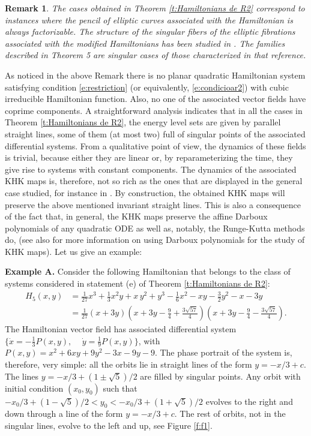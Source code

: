 \documentclass[11pt]{article}
\newtheorem {remark} [theorem]{Remark}
\begin{document}
\begin{remark}\label{r:remark7}
The cases obtained in Theorem \ref{t:Hamiltonians de R2} correspond to instances where the pencil of elliptic curves associated with the Hamiltonian is always factorizable. The structure of the singular fibers of the elliptic fibrations associated with the modified Hamiltonians has been studied in \cite[Corollary 2.12]{GMQ24}. The families described in Theorem 5 are singular cases of those characterized in that reference.
\end{remark}



As noticed in the above Remark there is no planar quadratic Hamiltonian system satisfying condition \eqref{e:restriction} (or equivalently, \eqref{e:condicioar2}) with  cubic irreducible Hamiltonian function. Also, no one of the associated vector fields have coprime components. A straightforward analysis indicates that in all the cases in Theorem \ref{t:Hamiltonians de R2}, the energy level sets are given by parallel straight lines, some of them (at most two) full of singular points of the associated differential systems.
From a qualitative point of view, the dynamics of these fields is trivial, because either they are linear or, by reparameterizing the time, they give rise to systems with constant components.
The dynamics of the associated KHK maps is, therefore, not so rich as the ones that are displayed in the general case studied, for instance in \cite{Celledoni2019b,Kam19,Petrera19-1,Petrera19-2}. By construction, the obtained KHK maps will preserve the above mentioned invariant straight lines. This is also a consequence of the fact that, in general, the KHK maps
preserve the affine Darboux polynomials of any quadratic ODE \cite[Theorem 1]{Celledoni2019c} as well as, notably, the Runge-Kutta methods do, \cite[Theorem 3.1]{Tapley} (see also \cite{Celledoni2022} for more information on using Darboux polynomials for the study of KHK maps). Let us give an example:

\medskip

\noindent \textbf{Example A.}  Consider the following Hamiltonian that belongs to the class of systems considered in statement (e) of Theorem \ref{t:Hamiltonians de R2}:  \begin{align}
H_5(x,y)&=\frac{1}{27} x^{3}+\frac{1}{3} x^{2} y +x \,y^{2}+y^{3}-\frac{1}{6} x^{2}-x y -\frac{3}{2} y^{2}-x -3 y\label{e:ex}\\
&=\frac{1}{27}  \left(x+3 y  \right)\left(x +3 y -\frac{9}{4}+\frac{3 \sqrt{57}}{4}\right)\left(x +3 y -\frac{9}{4}-\frac{3 \sqrt{57}}{4}\right).\nonumber
\end{align}
The Hamiltonian vector field has associated differential  system $\{
\dot{x}=-\frac{1}{3} P(x,y),\, \quad \dot{y}=\frac{1}{9} P(x,y)\}$,
with $P(x,y)=x^{2}+6 x y +9 y^{2}-3 x -9 y -9$.
The phase portrait of the system is, therefore, very simple: all the orbits lie in straight lines of the form $y=-x/3+c$. The lines $y=-x/3+(1\pm\sqrt{5})/2$ are filled by singular points.
Any orbit with initial condition $(x_0,y_0)$ such that
$-x_0/3+(1-\sqrt{5})/2<y_0<-x_0/3+(1+\sqrt{5})/2$
evolves to the right and down through a line of the form $y=-x/3+c$. The rest of orbits, not in the singular lines, evolve to the left and up,  see Figure \ref{f:f1}.
\end{document}
